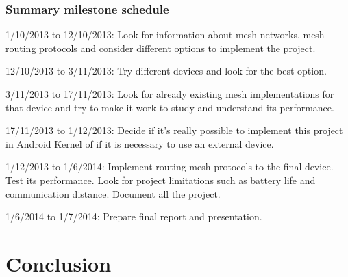 \documentclass[draftclsnofoot,12pt,journal,onecolumn]{IEEEtran}
\begin{document}
\subsubsection{Summary milestone schedule}

1/10/2013 to 12/10/2013: Look for information about mesh networks, mesh routing protocols and consider different options to implement the project.

12/10/2013 to 3/11/2013: Try different devices and look for the best option.

3/11/2013 to 17/11/2013: Look for already existing mesh implementations for that device and try to make it work to study and understand its performance.

17/11/2013 to 1/12/2013: Decide if it's really possible to implement this project in Android Kernel of if it is necessary to use an external device.

1/12/2013 to 1/6/2014: Implement routing mesh protocols to the final device. Test its performance. Look for project limitations such as battery life and communication distance. Document all the project.

1/6/2014 to 1/7/2014: Prepare final report and presentation.

\section{Conclusion}
\label{sec:conclusion}






%
\end{document}
